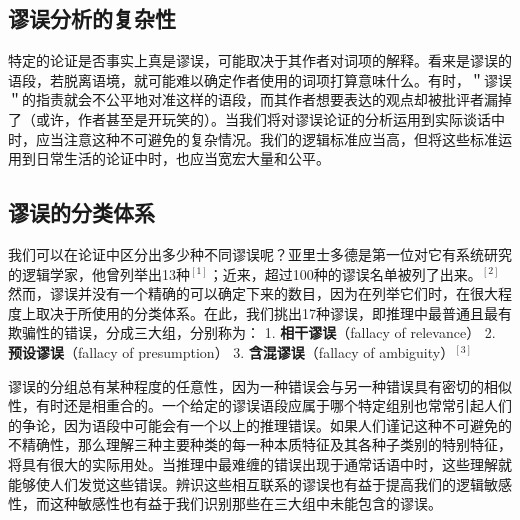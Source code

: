 \subsection{谬误分析的复杂性}

特定的论证是否事实上真是谬误，可能取决于其作者对词项的解释。看来是谬误的语段，若脱离语境，就可能难以确定作者使用的词项打算意味什么。有时，＂谬误＂的指责就会不公平地对准这样的语段，而其作者想要表达的观点却被批评者漏掉了（或许，作者甚至是开玩笑的）。当我们将对谬误论证的分析运用到实际谈话中时，应当注意这种不可避免的复杂情况。我们的逻辑标准应当高，但将这些标准运用到日常生活的论证中时，也应当宽宏大量和公平。

\subsection{谬误的分类体系}

我们可以在论证中区分出多少种不同谬误呢？亚里士多德是第一位对它有系统研究的逻辑学家，他曾列举出13种${}^{[1]}$；近来，超过100种的谬误名单被列了出来。${ }^{[2]}$然而，谬误并没有一个精确的可以确定下来的数目，因为在列举它们时，在很大程度上取决于所使用的分类体系。在此，我们挑出17种谬误，即推理中最普通且最有欺骗性的错误，分成三大组，分别称为：
1. \textbf{相干谬误}（fallacy of relevance）
2. \textbf{预设谬误}（fallacy of presumption）
3. \textbf{含混谬误}（fallacy of ambiguity）${}^{[3]}$

谬误的分组总有某种程度的任意性，因为一种错误会与另一种错误具有密切的相似性，有时还是相重合的。一个给定的谬误语段应属于哪个特定组别也常常引起人们的争论，因为语段中可能会有一个以上的推理错误。如果人们谨记这种不可避免的不精确性，那么理解三种主要种类的每一种本质特征及其各种子类别的特别特征，将具有很大的实际用处。当推理中最难缠的错误出现于通常话语中时，这些理解就能够使人们发觉这些错误。辨识这些相互联系的谬误也有益于提高我们的逻辑敏感性，而这种敏感性也有益于我们识别那些在三大组中未能包含的谬误。

\begin{center}
\end{center} 